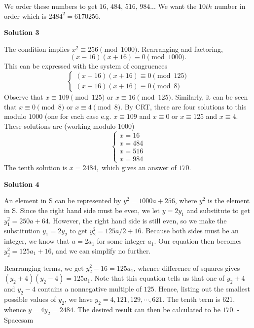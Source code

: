 \begin{enumerate}
 We order these numbers to get  $16$, $484$, $516$, $984$... We want the $10th$ number in order which is $2484^2 = 6\boxed{170}256$.

 



\textbf{Solution 3}

The condition implies $x^2\equiv 256 \pmod{1000}$. Rearranging and factoring, 
 \[(x-16)(x+16)\equiv 0\pmod {1000}.\]This can be expressed with the system of congruences
 \[\begin{cases}  (x-16)(x+16)\equiv 0\pmod{125} \\ (x-16)(x+16)\equiv 0\pmod{8} \end{cases}\]Observe that $x\equiv {109} \pmod {125}$ or $x\equiv{16}\pmod {125}$. Similarly, it can be seen that $x\equiv{0}\pmod{8}$ or $x\equiv{4}\pmod{8}$. By CRT, there are four solutions to this modulo $1000$ (one for each case e.g. $x\equiv{109}$ and $x\equiv{0}$ or $x\equiv{125}$ and $x\equiv{4}$. These solutions are (working modulo $1000$)
 \[\begin{cases}  x=16 \\ x=484 \\ x= 516 \\ x=984 \end{cases}\] The tenth solution is $x=2484,$ which gives an answer of $\boxed{170}$.

 



\textbf{Solution 4}

An element in S can be represented by $y^2 = 1000a + 256$, where $y^2$ is the element in S. Since the right hand side must be even, we let $y = 2y_1$ and substitute to get $y_1^2 = 250a + 64$. However, the right hand side is still even, so we make the substitution $y_1 = 2y_2$ to get $y_2^2 = 125a/2 + 16$. Because both sides must be an integer, we know that $a = 2a_1$ for some integer $a_1$. Our equation then becomes $y_2^2 = 125a_1 + 16$, and we can simplify no further.

 Rearranging terms, we get $y_2^2 - 16 = 125a_1$, whence difference of squares gives $(y_2 + 4)(y_2 - 4) = 125a_1$. Note that this equation tells us that one of $y_2 + 4$ and $y_2 - 4$ contains a nonnegative multiple of $125$. Hence, listing out the smallest possible values of $y_2$, we have $y_2 = 4, 121, 129, \cdots, 621$. The tenth term is $621$, whence $y = 4y_2 = 2484$. The desired result can then be calculated to be $\boxed{170}$. - Spacesam

 




\end{enumerate}
